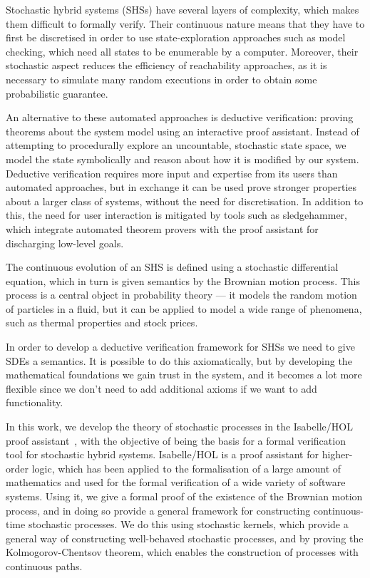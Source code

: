 \documentclass[orivec, envcountsame]{llncs}
\begin{document}
Stochastic hybrid systems (SHSs) have several layers of complexity, which makes them difficult to formally verify. Their continuous nature means that they have to first be discretised in order to use state-exploration approaches such as model checking, which need all states to be enumerable by a computer. Moreover, their stochastic aspect reduces the efficiency of reachability approaches, as it is necessary to simulate many random executions in order to obtain some probabilistic guarantee.

An alternative to these automated approaches is deductive verification: proving theorems about the system model using an interactive proof assistant. Instead of attempting to procedurally explore an uncountable, stochastic state space, we model the state symbolically and reason about how it is modified by our system. Deductive verification requires more input and expertise from its users than automated approaches, but in exchange it can be used prove stronger properties about a larger class of systems, without the need for discretisation. In addition to this, the need for user interaction is mitigated by tools such as sledgehammer\cite{sledgehammer}, which integrate automated theorem provers with the proof assistant for discharging low-level goals.

The continuous evolution of an SHS is defined using a stochastic differential equation, which in turn is given semantics by the Brownian motion process. This process is a central object in probability theory --- it models the random motion of particles in a fluid, but it can be applied to model a wide range of phenomena, such as thermal properties\cite{jang04} and stock prices\cite{osborne59}.

In order to develop a deductive verification framework for SHSs we need to give SDEs a semantics. It is possible to do this axiomatically, but by developing the mathematical foundations we gain trust in the system, and it becomes a lot more flexible since we don't need to add additional axioms if we want to add functionality.

In this work, we develop the theory of stochastic processes in the Isabelle/HOL proof assistant~\cite{isabelle}, with the objective of being the basis for a formal verification tool for stochastic hybrid systems. Isabelle/HOL is a proof assistant for higher-order logic, which has been applied to the formalisation of a large amount of mathematics and used for the formal verification of a wide variety of software systems. Using it, we give a formal proof of the existence of the Brownian motion process, and in doing so provide a general framework for constructing continuous-time stochastic processes. We do this using stochastic kernels, which provide a general way of constructing well-behaved stochastic processes, and by proving the Kolmogorov-Chentsov theorem, which enables the construction of processes with continuous paths.
\end{document}
